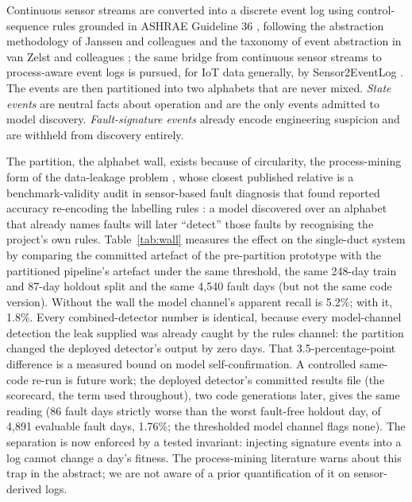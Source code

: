 \documentclass[11pt,letterpaper]{article}
\begin{document}
Continuous sensor streams are converted into a discrete event log using control-sequence rules grounded in ASHRAE Guideline 36 \cite{ashrae2021guideline36}, following the abstraction methodology of Janssen and colleagues \cite{janssen2021sensoreventlog} and the taxonomy of event abstraction in van Zelst and colleagues \cite{vanzelst2021eventabstraction}; the same bridge from continuous sensor streams to process-aware event logs is pursued, for IoT data generally, by Sensor2EventLog \cite{moradbeikie2026sensor2eventlog}. The events are then partitioned into two alphabets that are never mixed. \emph{State events} are neutral facts about operation and are the only events admitted to model discovery. \emph{Fault-signature events} already encode engineering suspicion and are withheld from discovery entirely.

The partition, the alphabet wall, exists because of circularity, the process-mining form of the data-leakage problem \cite{weytjens2022dataleakage,kapoor2023leakage}, whose closest published relative is a benchmark-validity audit in sensor-based fault diagnosis that found reported accuracy re-encoding the labelling rules \cite{saydirasulov2026fcu}: a model discovered over an alphabet that already names faults will later ``detect'' those faults by recognising the project's own rules. Table~\ref{tab:wall} measures the effect on the single-duct system by comparing the committed artefact of the pre-partition prototype with the partitioned pipeline's artefact under the same threshold, the same 248-day train and 87-day holdout split and the same 4{,}540 fault days (but not the same code version). Without the wall the model channel's apparent recall is 5.2\%; with it, 1.8\%. Every combined-detector number is identical, because every model-channel detection the leak supplied was already caught by the rules channel: the partition changed the deployed detector's output by zero days. That 3.5-percentage-point difference is a measured bound on model self-confirmation. A controlled same-code re-run is future work; the deployed detector's committed results file (the scorecard, the term used throughout), two code generations later, gives the same reading (86 fault days strictly worse than the worst fault-free holdout day, of 4{,}891 evaluable fault days, 1.76\%; the thresholded model channel flags none). The separation is now enforced by a tested invariant: injecting signature events into a log cannot change a day's fitness. The process-mining literature warns about this trap in the abstract; we are not aware of a prior quantification of it on sensor-derived logs.
\end{document}
